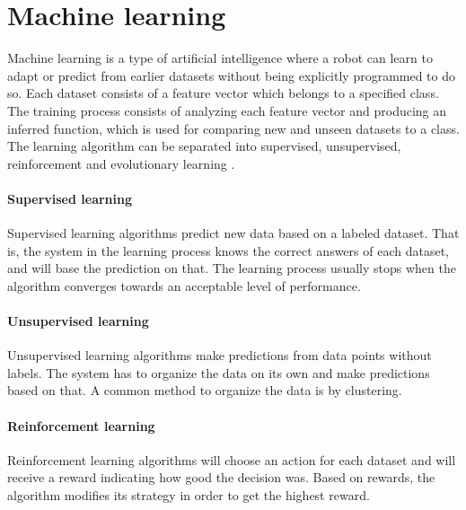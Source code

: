 \documentclass[USenglish]{ifimaster}  %
\begin{document}


\section {Machine learning}
Machine learning is a type of artificial intelligence where a robot can learn to adapt or predict from earlier datasets without being explicitly programmed to do so. Each dataset consists of a feature vector which belongs to a specified class. The training process consists of analyzing each feature vector and producing an inferred function, which is used for comparing new and unseen datasets to a class. The learning algorithm can be separated into supervised, unsupervised, reinforcement and evolutionary learning \cite{Marsland:2009:MLA:1571643}.

\paragraph{Supervised learning}
Supervised learning algorithms predict new data based on a labeled dataset. That is, the system in the learning process knows the correct answers of each dataset, and will base the prediction on that. The learning process usually stops when the algorithm converges towards an acceptable level of performance.
	
\paragraph{Unsupervised learning}
Unsupervised learning algorithms make predictions from data points without labels. The system has to organize the data on its own and make predictions based on that. A common method to organize the data is by clustering.
	
\paragraph{Reinforcement learning}
Reinforcement learning algorithms will choose an action for each dataset and will receive a reward indicating how good the decision was. Based on rewards, the algorithm modifies its strategy in order to get the highest reward.  
	
\end{document}
